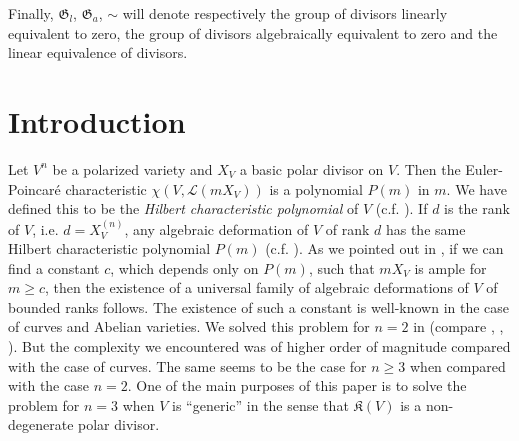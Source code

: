 Finally, $\mathfrak{G}_{l}$, $\mathfrak{G}_{a}$, $\sim$ will denote respectively the group of divisors linearly equivalent to zero, the group of divisors algebraically equivalent to zero and the linear equivalence of divisors.

\section*{Introduction}\pageoriginale

Let $V^{n}$ be a polarized variety and $X_{V}$ a basic polar divisor on $V$. Then the Euler-Poincar\'e characteristic $\chi(V,\mathscr{L}(mX_{V}))$ is a polynomial $P(m)$ in $m$. We have defined this to be the {\em Hilbert characteristic polynomial} of $V$ (c.f. \cite{art14-key16}). If $d$ is the rank of $V$, i.e. $d=X^{(n)}_{V}$, any algebraic deformation of $V$ of rank $d$ has the same Hilbert characteristic polynomial $P(m)$ (c.f. \cite{art14-key16}). As we pointed out in \cite{art14-key16}, if we can find a constant $c$, which depends only on $P(m)$, such that $mX_{V}$ is ample for $m\geq c$, then the existence of a universal family of algebraic deformations of $V$ of bounded ranks follows. The existence of such a constant is well-known in the case of curves and Abelian varieties. We solved this problem for $n=2$ in \cite{art14-key17} (compare \cite{art14-key9}, \cite{art14-key10}, \cite{art14-key12}). But the complexity we encountered was of higher order of magnitude compared with the case of curves. The same seems to be the case for $n\geq 3$ when compared with the case $n=2$. One of the main purposes of this paper is to solve the problem for $n=3$ when $V$ is ``generic'' in the sense that $\mathfrak{K}(V)$ is a non-degenerate polar divisor.

